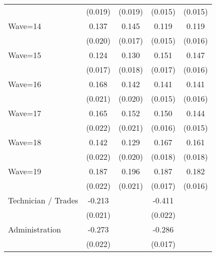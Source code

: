 {\begin{tabular}{l*{4}{c}}
                    &     (0.019)         &     (0.019)         &     (0.015)         &     (0.015)         \\
[1em]
Wave=14             &       0.137\sym{***}&       0.145\sym{***}&       0.119\sym{***}&       0.119\sym{***}\\
                    &     (0.020)         &     (0.017)         &     (0.015)         &     (0.016)         \\
[1em]
Wave=15             &       0.124\sym{***}&       0.130\sym{***}&       0.151\sym{***}&       0.147\sym{***}\\
                    &     (0.017)         &     (0.018)         &     (0.017)         &     (0.016)         \\
[1em]
Wave=16             &       0.168\sym{***}&       0.142\sym{***}&       0.141\sym{***}&       0.141\sym{***}\\
                    &     (0.021)         &     (0.020)         &     (0.015)         &     (0.016)         \\
[1em]
Wave=17             &       0.165\sym{***}&       0.152\sym{***}&       0.150\sym{***}&       0.144\sym{***}\\
                    &     (0.022)         &     (0.021)         &     (0.016)         &     (0.015)         \\
[1em]
Wave=18             &       0.142\sym{***}&       0.129\sym{***}&       0.167\sym{***}&       0.161\sym{***}\\
                    &     (0.022)         &     (0.020)         &     (0.018)         &     (0.018)         \\
[1em]
Wave=19             &       0.187\sym{***}&       0.196\sym{***}&       0.187\sym{***}&       0.182\sym{***}\\
                    &     (0.022)         &     (0.021)         &     (0.017)         &     (0.016)         \\
[1em]
Technician / Trades &      -0.213\sym{***}&                     &      -0.411\sym{***}&                     \\
                    &     (0.021)         &                     &     (0.022)         &                     \\
[1em]
Administration      &      -0.273\sym{***}&                     &      -0.286\sym{***}&                     \\
                    &     (0.022)         &                     &     (0.017)         &                     \\

\end{tabular}}
